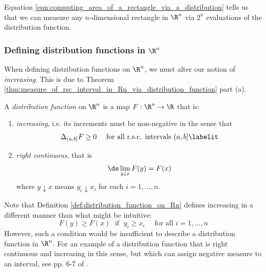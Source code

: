 \documentclass{article} %
\newenvironment{alphabate}
    {\begin{enumerate}[label=\alph*)]}
	{\end{enumerate} }
\begin{document}
\begin{remark}
Equation \eqref{eqn:computing_area_of_a_rectangle_via_a_distribution} tells us that we can measure any $n$-dimensional rectangle in $\R^n$ via $2^n$ evaluations of the distribution function. 
\end{remark}


\subsubsection{Defining distribution functions in $\R^n$}

When defining distribution functions on $\R^n$,  we must alter our notion of \textit{increasing}.     This is due to Theorem \ref{thm:measure_of_rsc_interval_in_Rn_via_distribution_function} part (a).

\begin{definition}
 A \textit{distribution function} on $\R^n$ is a map $F : \R^n \to \R$ that is:
 
 \begin{alphabate}
 \item \textit{increasing}, i.e. its increments must be non-negative in the sense that
 \begin{align*}
 \Delta_{(a,b]} F \geq 0 \quad \text{ for all r.s.c. intervals $(a,b]$}
 \labelit \label{eqn:increasing_condition_for_distribution_functions_on_Rn}
 \end{align*}



 \item \textit{right continuous}, that is
 \[ \ds\lim_{y \downarrow x} F(y) = F(x) \]
 where $y \downarrow x$ means $y_i \downarrow x_i$ for each $i=1,...,n$.
 \end{alphabate}
 \label{def:distribution_function_on_Rn}
 \end{definition}
 
 \begin{remark}
 Note that Definition \ref{def:distribution_function_on_Rn} defines increasing in a different manner than what might be intuitive:
 \[ F(y) \geq F(x) \; \text { if } \; y_i \geq x_i \quad \text{ for all } i=1,...,n\]
 However, such a condition would be insufficient to describe a distribution function in $\R^n.$ For an example of a distribution function that is right continuous and increasing in this sense, but which can assign negative measure to an interval, see pp. 6-7 of \cite{durrett2010probability}.
 \end{remark}
\end{document}
